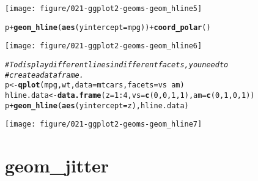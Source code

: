 \documentclass[a4paper,titlepage]{tufte-handout}\usepackage[]{graphicx}\usepackage[]{color}
\makeatletter
\def\maxwidth{ %
  \ifdim\Gin@nat@width>\linewidth
    \linewidth
  \else
    \Gin@nat@width
  \fi
}
\newcommand{\hlnum}[1]{\textcolor[rgb]{0.686,0.059,0.569}{#1}}%
\newcommand{\hlcom}[1]{\textcolor[rgb]{0.678,0.584,0.686}{\textit{#1}}}%
\newcommand{\hlopt}[1]{\textcolor[rgb]{0,0,0}{#1}}%
\newcommand{\hlstd}[1]{\textcolor[rgb]{0.345,0.345,0.345}{#1}}%
\newcommand{\hlkwb}[1]{\textcolor[rgb]{0.69,0.353,0.396}{#1}}%
\newcommand{\hlkwc}[1]{\textcolor[rgb]{0.333,0.667,0.333}{#1}}%
\newcommand{\hlkwd}[1]{\textcolor[rgb]{0.737,0.353,0.396}{\textbf{#1}}}%
\newenvironment{kframe}{%
 \def\at@end@of@kframe{}%
 \ifinner\ifhmode%
  \def\at@end@of@kframe{\end{minipage}}%
  \begin{minipage}{\columnwidth}%
 \fi\fi%
 \def\FrameCommand##1{\hskip\@totalleftmargin \hskip-\fboxsep
 \colorbox{shadecolor}{##1}\hskip-\fboxsep
     \hskip-\linewidth \hskip-\@totalleftmargin \hskip\columnwidth}%
 \MakeFramed {\advance\hsize-\width
   \@totalleftmargin\z@ \linewidth\hsize
   \@setminipage}}%
 {\par\unskip\endMakeFramed%
 \at@end@of@kframe}
\newenvironment{knitrout}{}{} %
\makeatother
\begin{document}
\begin{knitrout}
\begin{kframe}
\end{kframe}
\texttt{[image: figure/021-ggplot2-geoms-geom\_hline5]} 
\begin{kframe}\begin{alltt}
\hlstd{p} \hlopt{+} \hlkwd{geom_hline}\hlstd{(}\hlkwd{aes}\hlstd{(}\hlkwc{yintercept}\hlstd{=mpg))} \hlopt{+} \hlkwd{coord_polar}\hlstd{()}
\end{alltt}
\end{kframe}
\texttt{[image: figure/021-ggplot2-geoms-geom\_hline6]} 
\begin{kframe}\begin{alltt}
\hlcom{# To display different lines in different facets, you need to}
\hlcom{# create a data frame.}
\hlstd{p} \hlkwb{<-} \hlkwd{qplot}\hlstd{(mpg, wt,} \hlkwc{data}\hlstd{=mtcars,} \hlkwc{facets} \hlstd{= vs} \hlopt{~} \hlstd{am)}
\hlstd{hline.data} \hlkwb{<-} \hlkwd{data.frame}\hlstd{(}\hlkwc{z} \hlstd{=} \hlnum{1}\hlopt{:}\hlnum{4}\hlstd{,} \hlkwc{vs} \hlstd{=} \hlkwd{c}\hlstd{(}\hlnum{0}\hlstd{,}\hlnum{0}\hlstd{,}\hlnum{1}\hlstd{,}\hlnum{1}\hlstd{),} \hlkwc{am} \hlstd{=} \hlkwd{c}\hlstd{(}\hlnum{0}\hlstd{,}\hlnum{1}\hlstd{,}\hlnum{0}\hlstd{,}\hlnum{1}\hlstd{))}
\hlstd{p} \hlopt{+} \hlkwd{geom_hline}\hlstd{(}\hlkwd{aes}\hlstd{(}\hlkwc{yintercept} \hlstd{= z), hline.data)}
\end{alltt}
\end{kframe}
\texttt{[image: figure/021-ggplot2-geoms-geom\_hline7]} 
\begin{kframe}\begin{alltt}


\end{alltt}
\end{kframe}
\end{knitrout}



\section{geom\_jitter}
\end{document}
